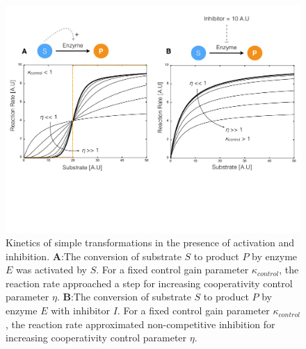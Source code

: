 \documentclass[12pt]{article}
\begin{document}
\begin{figure}
\centering
\includegraphics[width=1.0\textwidth]{./figs/Figure-3-EnzymeKinetics.pdf}
\caption{Kinetics of simple transformations in the presence of activation and inhibition. 
\textbf{A}:The conversion of substrate $S$ to product $P$ by enzyme $E$ was activated by $S$. 
For a fixed control gain parameter $\kappa_{control}$, the reaction rate approached a step for increasing cooperativity control parameter $\eta$. 
\textbf{B}:The conversion of substrate $S$ to product $P$ by enzyme $E$ with inhibitor $I$. 
For a fixed control gain parameter $\kappa_{control}$, the reaction rate approximated non-competitive inhibition for increasing cooperativity control parameter $\eta$. 
}\label{fig-kinetics-simulations}
\end{figure}

\clearpage
\end{document}
